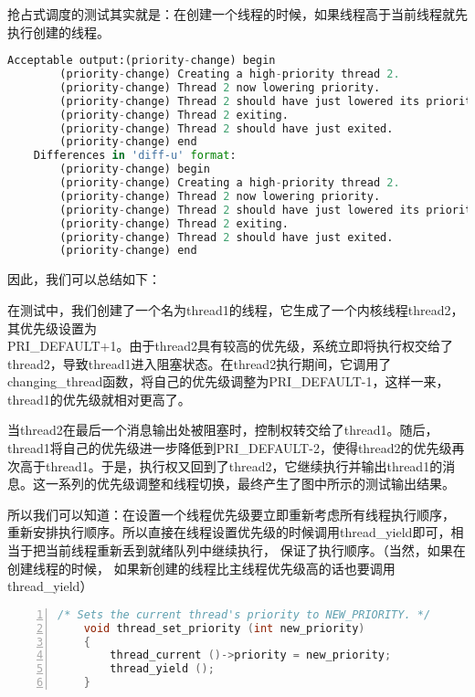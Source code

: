 \documentclass{article}
\begin{document}
	抢占式调度的测试其实就是：在创建一个线程的时候，如果线程高于当前线程就先执行创建的线程。
	
	\begin{lstlisting}[language=Python, caption={Priority Change Example}]
    Acceptable output:(priority-change) begin
        (priority-change) Creating a high-priority thread 2.
        (priority-change) Thread 2 now lowering priority.
        (priority-change) Thread 2 should have just lowered its priority.
        (priority-change) Thread 2 exiting.
        (priority-change) Thread 2 should have just exited.
        (priority-change) end
    Differences in 'diff-u' format:
        (priority-change) begin
        (priority-change) Creating a high-priority thread 2.
        (priority-change) Thread 2 now lowering priority.
        (priority-change) Thread 2 should have just lowered its priority.
        (priority-change) Thread 2 exiting.
        (priority-change) Thread 2 should have just exited.
        (priority-change) end
	\end{lstlisting}
	
	因此，我们可以总结如下：
	
	在测试中，我们创建了一个名为thread1的线程，它生成了一个内核线程thread2，其优先级设置为\\PRI\_DEFAULT+1。由于thread2具有较高的优先级，系统立即将执行权交给了thread2，导致thread1进入阻塞状态。在thread2执行期间，它调用了changing\_thread函数，将自己的优先级调整为PRI\_DEFAULT-1，这样一来，thread1的优先级就相对更高了。
	
    当thread2在最后一个消息输出处被阻塞时，控制权转交给了thread1。随后，thread1将自己的优先级进一步降低到PRI\_DEFAULT-2，使得thread2的优先级再次高于thread1。于是，执行权又回到了thread2，它继续执行并输出thread1的消息。这一系列的优先级调整和线程切换，最终产生了图中所示的测试输出结果。
    
    所以我们可以知道：在设置一个线程优先级要立即重新考虑所有线程执行顺序， 重新安排执行顺序。所以直接在线程设置优先级的时候调用thread\_yield即可，相当于把当前线程重新丢到就绪队列中继续执行， 保证了执行顺序。（当然，如果在创建线程的时候， 如果新创建的线程比主线程优先级高的话也要调用thread\_yield）
	
	\begin{lstlisting}[xleftmargin = 4em,xrightmargin = 4em, aboveskip = 1em, numbers = left, language = C, title=\texttt{thread\_set\_priority}函数]
    /* Sets the current thread's priority to NEW_PRIORITY. */
    void thread_set_priority (int new_priority)
    {
    	thread_current ()->priority = new_priority;
    	thread_yield ();
    }
	\end{lstlisting}
	
\end{document}

